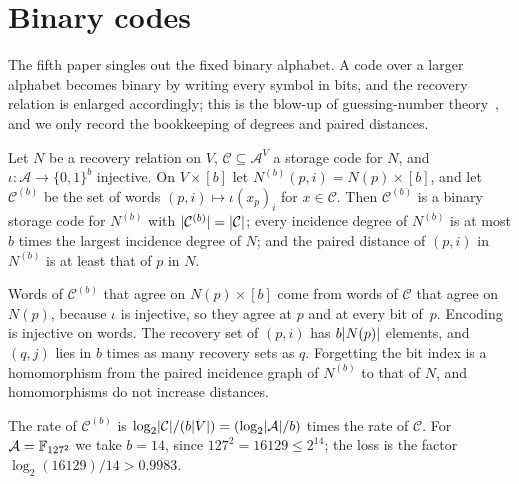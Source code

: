 \section{Binary codes}\label{sec:binary}

The fifth paper singles out the fixed binary alphabet. A code over a larger alphabet becomes binary by writing every
symbol in bits, and the recovery relation is enlarged accordingly; this is the blow-up of guessing-number
theory~\cite{ChristofidesMarkstrom2011}, and we only record the bookkeeping of degrees and paired distances.

\begin{lemma}[Blow-up]\label{lem:blowup}
Let $N$ be a recovery relation on $V$, $\mathcal C\subseteq\mathcal A^V$ a storage code for $N$, and
$\iota\colon\mathcal A\to\{0,1\}^b$ injective. On $V\times[b]$ let $N^{(b)}(p,i)=N(p)\times[b]$, and let $\mathcal C^{(b)}$ be the
set of words $(p,i)\mapsto\iota(x_p)_i$ for $x\in\mathcal C$. Then $\mathcal C^{(b)}$ is a binary storage code for $N^{(b)}$
with $\lvert \mathcal C^{(b)} \rvert=\lvert \mathcal C \rvert$; every incidence degree of $N^{(b)}$ is at most $b$ times the largest incidence
degree of $N$; and the paired distance of $(p,i)$ in $N^{(b)}$ is at least that of $p$ in $N$.
\end{lemma}
\begin{outline}
Words of $\mathcal C^{(b)}$ that agree on $N(p)\times[b]$ come from words of $\mathcal C$ that agree on $N(p)$, because
$\iota$ is injective, so they agree at $p$ and at every bit of~$p$. Encoding is injective on words. The recovery set of
$(p,i)$ has $b\lvert N(p) \rvert$ elements, and $(q,j)$ lies in $b$ times as many recovery sets as $q$. Forgetting the bit index
is a homomorphism from the paired incidence graph of $N^{(b)}$ to that of $N$, and homomorphisms do not increase
distances.
\end{outline}

The rate of $\mathcal C^{(b)}$ is $\log_2\lvert \mathcal C \rvert/(b\lvert V \rvert)=(\log_2\lvert \mathcal A \rvert/b)$ times the rate of
$\mathcal C$. For $\mathcal A=\mathbb{F}_{127^2}$ we take $b=14$, since $127^2=16129\le2^{14}$; the loss is the factor
$\log_2(16129)/14>0.9983$.

